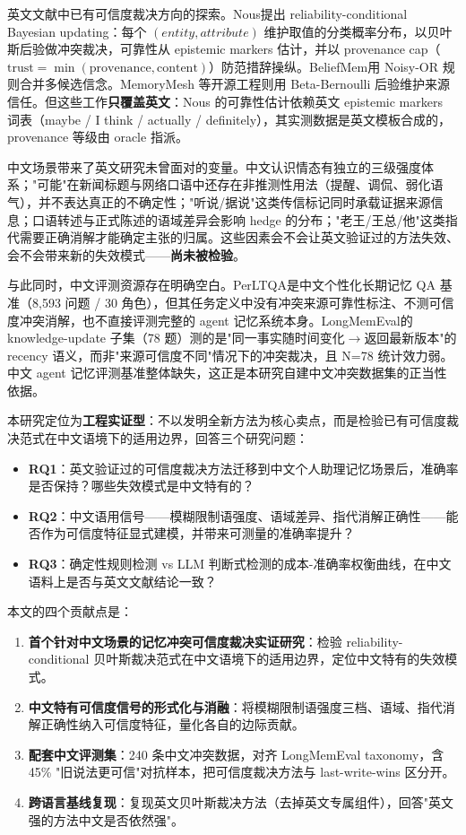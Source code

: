 \documentclass{article}
\begin{document}
英文文献中已有可信度裁决方向的探索。Nous\citep{singh2026}提出 reliability-conditional Bayesian updating：每个 $(entity, attribute)$ 维护取值的分类概率分布，以贝叶斯后验做冲突裁决，可靠性从 epistemic markers 估计，并以 provenance cap（$\mathrm{trust}=\min(\mathrm{provenance},\mathrm{content})$）防范措辞操纵。BeliefMem\citep{liao2026}用 Noisy-OR 规则合并多候选信念。MemoryMesh 等开源工程则用 Beta-Bernoulli 后验维护来源信任。但这些工作\textbf{只覆盖英文}：Nous 的可靠性估计依赖英文 epistemic markers 词表（maybe / I think / actually / definitely），其实测数据是英文模板合成的，provenance 等级由 oracle 指派。


中文场景带来了英文研究未曾面对的变量。中文认识情态有独立的三级强度体系\citep{jia2023}；"可能"在新闻标题与网络口语中还存在非推测性用法（提醒、调侃、弱化语气），并不表达真正的不确定性；"听说/据说"这类传信标记同时承载证据来源信息；口语转述与正式陈述的语域差异会影响 hedge 的分布；"老王/王总/他"这类指代需要正确消解才能确定主张的归属。这些因素会不会让英文验证过的方法失效、会不会带来新的失效模式——\textbf{尚未被检验}。


与此同时，中文评测资源存在明确空白。PerLTQA\citep{du2024}是中文个性化长期记忆 QA 基准（8,593 问题 / 30 角色），但其任务定义中没有冲突来源可靠性标注、不测可信度冲突消解，也不直接评测完整的 agent 记忆系统本身。LongMemEval\citep{wang2024}的 knowledge-update 子集（78 题）测的是"同一事实随时间变化$\to$返回最新版本"的 recency 语义，而非"来源可信度不同"情况下的冲突裁决，且 N=78 统计效力弱。中文 agent 记忆评测基准整体缺失，这正是本研究自建中文冲突数据集的正当性依据。


本研究定位为\textbf{工程实证型}：不以发明全新方法为核心卖点，而是检验已有可信度裁决范式在中文语境下的适用边界，回答三个研究问题：


\begin{itemize}
\item \textbf{RQ1}：英文验证过的可信度裁决方法迁移到中文个人助理记忆场景后，准确率是否保持？哪些失效模式是中文特有的？
\item \textbf{RQ2}：中文语用信号——模糊限制语强度、语域差异、指代消解正确性——能否作为可信度特征显式建模，并带来可测量的准确率提升？
\item \textbf{RQ3}：确定性规则检测 vs LLM 判断式检测的成本-准确率权衡曲线，在中文语料上是否与英文文献结论一致？
\end{itemize}

本文的四个贡献点是：


\begin{enumerate}
\item \textbf{首个针对中文场景的记忆冲突可信度裁决实证研究}：检验 reliability-conditional 贝叶斯裁决范式在中文语境下的适用边界，定位中文特有的失效模式。
\item \textbf{中文特有可信度信号的形式化与消融}：将模糊限制语强度三档、语域、指代消解正确性纳入可信度特征，量化各自的边际贡献。
\item \textbf{配套中文评测集}：240 条中文冲突数据，对齐 LongMemEval taxonomy，含 45\% "旧说法更可信"对抗样本，把可信度裁决方法与 last-write-wins 区分开。
\item \textbf{跨语言基线复现}：复现英文贝叶斯裁决方法（去掉英文专属组件），回答"英文强的方法中文是否依然强"。
\end{enumerate}
\end{document}
